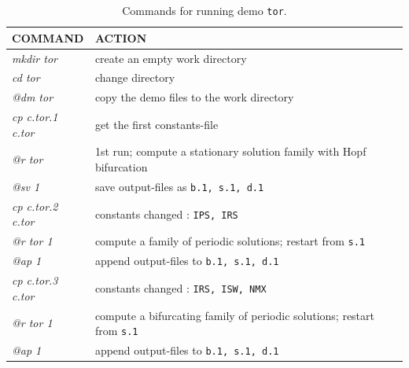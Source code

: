 \documentclass[12pt]{report}
\begin{document}
\begin{table}[htbp]
\begin{center}
\begin{tabular}{| l | l |}
\hline
  COMMAND  & ACTION \\
\hline
  {\it mkdir tor} & create an empty work directory \\ 
  {\it cd tor} & change directory \\
  {\it @dm tor} & copy the demo files to the work directory \\
\hline
  {\it cp c.tor.1 c.tor} & get the first constants-file \\ 
  {\it @r tor} & 1st run; compute a stationary solution family with Hopf bifurcation \\ 
  {\it @sv 1} & save output-files as {\tt b.1, s.1, d.1} \\ 
\hline
  {\it cp c.tor.2 c.tor} & constants changed : {\tt IPS, IRS }\\ 
  {\it @r tor 1} & compute a family of periodic solutions; restart from {\tt s.1} \\ 
  {\it @ap 1} & append output-files to {\tt b.1, s.1, d.1} \\ 
\hline
  {\it cp c.tor.3 c.tor} & constants changed : {\tt IRS, ISW, NMX} \\ 
  {\it @r tor 1} & compute a bifurcating family of periodic solutions; restart from {\tt s.1} \\ 
  {\it @ap 1} & append output-files to {\tt b.1, s.1, d.1} \\ 
\hline
\end{tabular}
\caption{Commands for running demo {\tt tor}.}
\label{tbl:demo_tor}
\end{center}
\end{table}

\newpage
\end{document}
